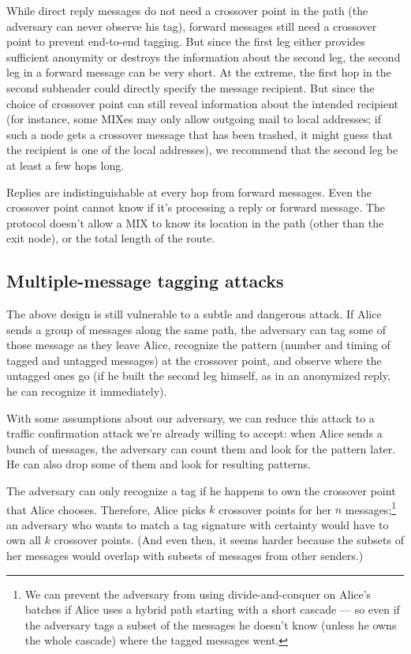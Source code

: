 \documentclass{llncs}
\begin{document}
While direct reply messages do not need a crossover point in the path
(the adversary can never observe his tag), forward messages still need a
crossover point to prevent end-to-end tagging. But since the first leg
either provides sufficient anonymity or destroys the information about
the second leg, the second leg in a forward message can be very short.
At the extreme, the first hop in the second subheader could directly
specify the message recipient. But since the choice of crossover point
can still reveal information about the intended recipient (for instance,
some MIXes may only allow outgoing mail to local addresses; if such a
node gets a crossover message that has been trashed, it might guess
that the recipient is one of the local addresses), we recommend that
the second leg be at least a few hops long.

Replies are indistinguishable at every hop from forward messages. Even the
crossover point cannot know if it's processing a reply or forward message.
The protocol doesn't allow a MIX to know its location in the path (other
than the exit node), or the total length of the route.

\subsection{Multiple-message tagging attacks}

The above design is still vulnerable to a subtle and dangerous
attack. If Alice sends a group of messages along the same path, the
adversary can tag some of those message as they leave Alice, recognize
the pattern (number and timing of tagged and untagged messages) at the
crossover point, and observe where the untagged ones go (if he built
the second leg himself, as in an anonymized reply, he can recognize
it immediately).

With some assumptions about our adversary, we can reduce
this attack to a traffic confirmation attack we're already willing to
accept: when Alice sends a bunch of messages, the adversary can count
them and look for the pattern later. He can also drop some of them and
look for resulting patterns.

The adversary can only recognize a tag if he happens to own the crossover
point that Alice chooses.
Therefore, Alice picks $k$ crossover points for her $n$
messages;\footnote{
  We can prevent the adversary from using divide-and-conquer on Alice's
  batches if Alice uses a hybrid path starting with a short cascade ---
  so even if the adversary tags a subset of the messages he doesn't know
  (unless he owns the whole cascade) where the tagged messages went.
}
an adversary who wants to match a tag signature with certainty would
have to own all $k$ crossover points.  (And even then, it seems harder
because the subsets of her messages would overlap with subsets of
messages from other senders.)
\end{document}
